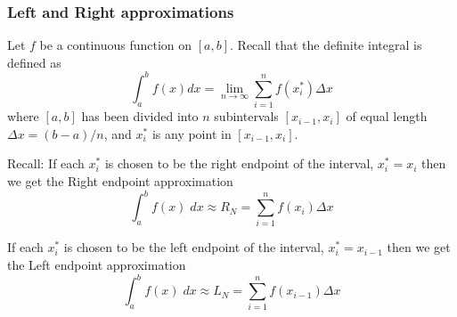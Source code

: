 \begin{frame}
\frametitle{Left and Right approximations}
Let $f$ be a continuous function on $[a,b]$.  Recall that the definite integral is defined as
\[
\int_a^b f(x)dx = \lim_{n\to \infty} \sum\limits_{i=1}^n
f(x_i^*)\Delta x
\]   
where $[a,b]$ has been divided into $n$ subintervals
$[x_{i-1},x_i]$ of equal length $\Delta x=(b-a)/n$, and $x_i^*$ is any
point in $[x_{i-1},x_i]$.\\ \pause 

Recall: If each $ x_i^* $ is chosen to be the right endpoint of the interval, $ x_i^* = x_{i}$   then we get the Right endpoint approximation 
\[
\int_a^b  f(x)\; dx \approx R_N  = \sum\limits_{i=1}^n f(x_{i})\Delta x
\]

\pause 
If each $ x_i^* $ is chosen to be the left endpoint of the interval, $ x_i^* = x_{i-1}$   then we get the Left endpoint approximation 
\[
\int_a^b f(x)\; dx \approx L_N = \sum\limits_{i=1}^n f(x_{i-1})\Delta x
\]

\end{frame}
